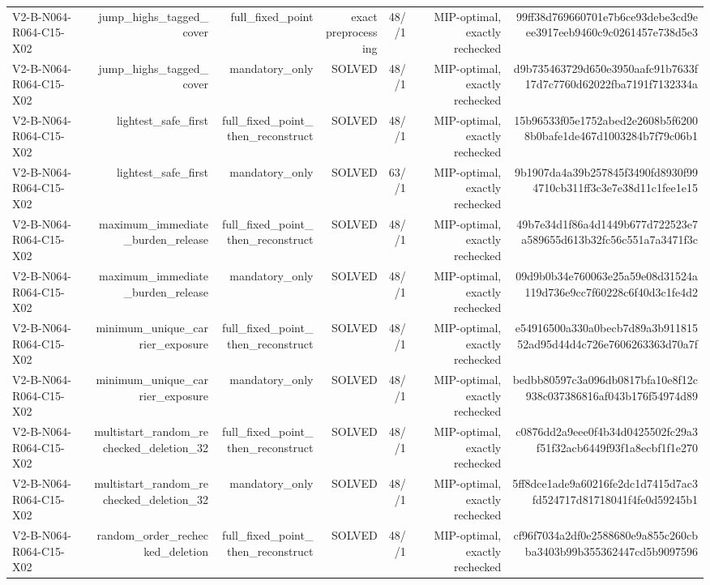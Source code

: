 {\begin{longtable}{lrrrrrr}
V2-B-N064-R064-C15-X02 & jump\_highs\_tagged\_cover & full\_fixed\_point & exact preprocessing & 48//1 & MIP-optimal, exactly rechecked & 99ff38d769660701e7b6ce93debe3cd9eee3917eeb9460c9c0261457e738d5e3 \\
V2-B-N064-R064-C15-X02 & jump\_highs\_tagged\_cover & mandatory\_only & SOLVED & 48//1 & MIP-optimal, exactly rechecked & d9b735463729d650e3950aafc91b7633f17d7c7760d62022fba7191f7132334a \\
V2-B-N064-R064-C15-X02 & lightest\_safe\_first & full\_fixed\_point\_then\_reconstruct & SOLVED & 48//1 & MIP-optimal, exactly rechecked & 15b96533f05e1752abed2e2608b5f62008b0bafe1de467d1003284b7f79c06b1 \\
V2-B-N064-R064-C15-X02 & lightest\_safe\_first & mandatory\_only & SOLVED & 63//1 & MIP-optimal, exactly rechecked & 9b1907da4a39b257845f3490fd8930f994710cb311ff3c3e7e38d11c1fee1e15 \\
V2-B-N064-R064-C15-X02 & maximum\_immediate\_burden\_release & full\_fixed\_point\_then\_reconstruct & SOLVED & 48//1 & MIP-optimal, exactly rechecked & 49b7e34d1f86a4d1449b677d722523e7a589655d613b32fc56c551a7a3471f3c \\
V2-B-N064-R064-C15-X02 & maximum\_immediate\_burden\_release & mandatory\_only & SOLVED & 48//1 & MIP-optimal, exactly rechecked & 09d9b0b34e760063e25a59e08d31524a119d736e9cc7f60228c6f40d3c1fe4d2 \\
V2-B-N064-R064-C15-X02 & minimum\_unique\_carrier\_exposure & full\_fixed\_point\_then\_reconstruct & SOLVED & 48//1 & MIP-optimal, exactly rechecked & e54916500a330a0becb7d89a3b91181552ad95d44d4c726e7606263363d70a7f \\
V2-B-N064-R064-C15-X02 & minimum\_unique\_carrier\_exposure & mandatory\_only & SOLVED & 48//1 & MIP-optimal, exactly rechecked & bedbb80597c3a096db0817bfa10e8f12c938c037386816af043b176f54974d89 \\
V2-B-N064-R064-C15-X02 & multistart\_random\_rechecked\_deletion\_32 & full\_fixed\_point\_then\_reconstruct & SOLVED & 48//1 & MIP-optimal, exactly rechecked & c0876dd2a9eee0f4b34d0425502fc29a3f51f32acb6449f93f1a8ecbf1f1e270 \\
V2-B-N064-R064-C15-X02 & multistart\_random\_rechecked\_deletion\_32 & mandatory\_only & SOLVED & 48//1 & MIP-optimal, exactly rechecked & 5ff8dce1ade9a60216fe2dc1d7415d7ac3fd524717d81718041f4fe0d59245b1 \\
V2-B-N064-R064-C15-X02 & random\_order\_rechecked\_deletion & full\_fixed\_point\_then\_reconstruct & SOLVED & 48//1 & MIP-optimal, exactly rechecked & cf96f7034a2df0e2588680e9a855c260cbba3403b99b355362447cd5b9097596 \\

\end{longtable}}
